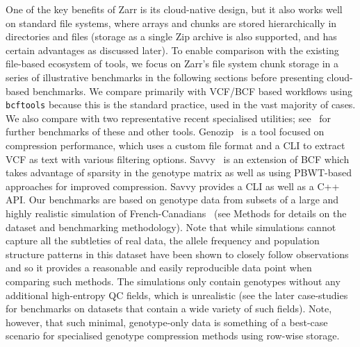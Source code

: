 \documentclass[a4paper,num-refs]{oup-contemporary}
\begin{document}
One of the key benefits of Zarr is its cloud-native design,
but it also works well on standard file systems, where
arrays and chunks are stored hierarchically in directories
and files (storage as a single Zip archive is also supported,
and has certain advantages as discussed later).
To enable comparison with the existing file-based ecosystem
of tools, we focus on Zarr's file system chunk storage in a series of illustrative
benchmarks in the following sections before presenting cloud-based benchmarks.
We compare primarily with
VCF/BCF based workflows using \texttt{bcftools} because this
is the standard practice, used in the vast majority of cases.
We also compare with two representative recent specialised utilities;
see~\cite{danek2018gtc,zhang2023gbc} for further benchmarks of
these and other tools.
Genozip~\cite{lan2020genozip,lan2021genozip} is a tool focused
on compression performance, which uses a custom file format
and a CLI to extract VCF as text with various filtering options.
Savvy~\cite{lefaive2021sparse} is an extension of BCF which
takes advantage of sparsity in the genotype matrix as well
as using PBWT-based approaches for improved compression.
Savvy provides a CLI as well as a C++ API.
Our benchmarks are based on genotype data
from subsets of a large and highly realistic
simulation of French-Canadians~\cite{anderson2023on}
(see Methods for details on the dataset and benchmarking methodology).
Note that while simulations cannot capture
all the subtleties of real data, the allele frequency
and population structure patterns in this dataset
have been shown to closely follow
observations~\cite{anderson2023on} and so it provides
a reasonable and easily reproducible data point
when comparing such methods.
The simulations only contain genotypes without any additional
high-entropy QC fields, which is unrealistic
(see the later case-studies
for benchmarks on datasets that contain a wide variety
of such fields).
Note, however, that such minimal, genotype-only data
is something of a best-case scenario for specialised genotype
compression methods using row-wise storage.
\end{document}

